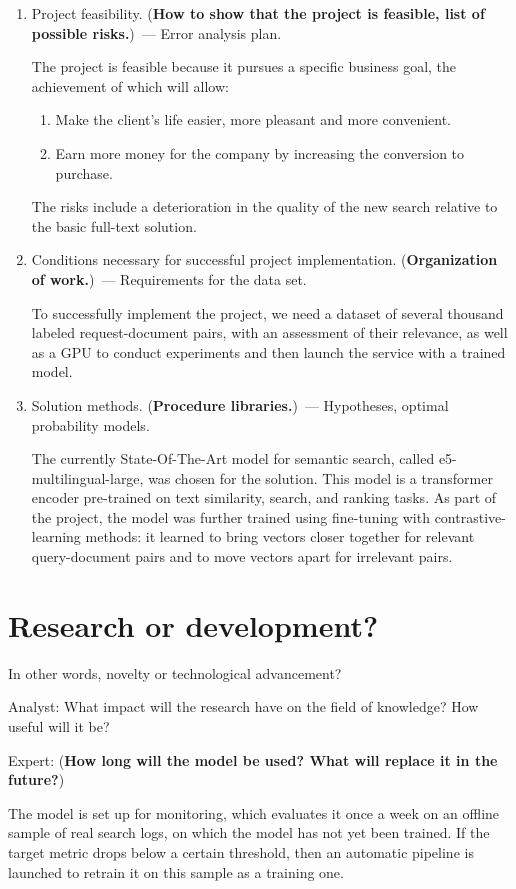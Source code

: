 \documentclass[12pt]{article}
\begin{document}
\begin{enumerate}
\item Project feasibility. (\textbf{How to show that the project is feasible, list of possible risks.})~--- Error analysis plan.  

The project is feasible because it pursues a specific business goal, the achievement of which will allow:

\begin{enumerate}
    \item Make the client's life easier, more pleasant and more convenient.
    \item Earn more money for the company by increasing the conversion to purchase.
\end{enumerate}

The risks include a deterioration in the quality of the new search relative to the basic full-text solution.  


\item Conditions necessary for successful project implementation. (\textbf{Organization of work.})~--- Requirements for the data set.  

To successfully implement the project, we need a dataset of several thousand labeled request-document pairs, with an assessment of their relevance, as well as a GPU to conduct experiments and then launch the service with a trained model.  

\item Solution methods. (\textbf{Procedure libraries.})~--- Hypotheses, optimal probability models.  

The currently State-Of-The-Art model for semantic search, called e5-multilingual-large, was chosen for the solution. This model is a transformer encoder pre-trained on text similarity, search, and ranking tasks. As part of the project, the model was further trained using fine-tuning with contrastive-learning methods: it learned to bring vectors closer together for relevant query-document pairs and to move vectors apart for irrelevant pairs.

\end{enumerate}  

\section{Research or development?}
In other words, novelty or technological advancement?

{Analyst:} What impact will the research have on the field of knowledge? How useful will it be?

{Expert:} (\textbf{How long will the model be used? What will replace it in the future?})  

The model is set up for monitoring, which evaluates it once a week on an offline sample of real search logs, on which the model has not yet been trained. If the target metric drops below a certain threshold, then an automatic pipeline is launched to retrain it on this sample as a training one.

%
%
\end{document}
